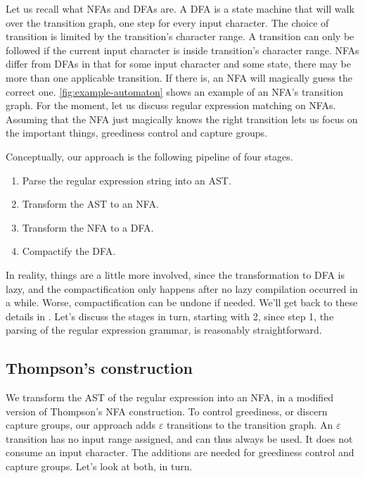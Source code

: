 \documentclass[english]{sigplanconf}
\theoremstyle{definition}
\begin{document}
Let us recall what NFAs and DFAs are. A DFA is a state machine that
will walk over the transition graph, one step for every input
character. The choice of transition is limited by the transition's
character range. A transition can only be followed if the current
input character is inside transition's character range. NFAs differ
from DFAs in that for some input character and some state, there
may be more than one applicable transition. If there is, an
NFA will magically guess the correct one. \autoref{fig:example-automaton}
shows an example of an NFA's transition graph. For the moment, let
us discuss regular expression matching on NFAs. Assuming that the
NFA just magically knows the right transition lets us focus on the
important things, greediness control and capture groups.

Conceptually, our approach is the following pipeline of four stages.
\begin{enumerate}
  \item Parse the regular expression string into an AST.
  \item Transform the AST to an NFA.
  \item Transform the NFA to a DFA. 
  \item Compactify the DFA.
\end{enumerate}

In reality, things are a little more involved, since the transformation
to DFA is lazy, and the compactification only happens after no lazy
compilation occurred in a while. Worse, compactification can be
undone if needed. We'll get back to these details in .
Let's discuss the stages in turn, starting with 2, since step 1,
the parsing of the regular expression grammar, is reasonably
straightforward.

\subsection{Thompson's construction} 

We transform the AST of the regular expression into an NFA,
in a modified version of Thompson's NFA construction. To
control greediness, or discern capture groups, our approach adds
$\varepsilon$ transitions to the transition graph. An
$\varepsilon$ transition has no input range assigned, and can thus always
be used. It does not consume an input character.
The additions are needed for greediness control and capture groups.
Let's look at both, in turn.
\end{document}
